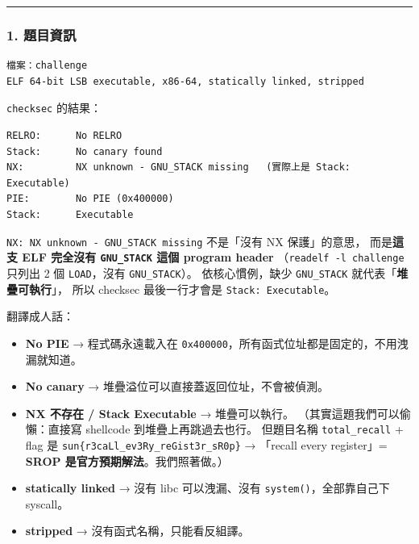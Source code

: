 \documentclass[10pt,a4paper]{article}
\providecommand{\tightlist}{%
  \setlength{\itemsep}{0pt}\setlength{\parskip}{0pt}}
\renewenvironment{quote}{%
  \begin{mdframed}[linewidth=0pt,innerleftmargin=0pt,innerrightmargin=0pt,
    innerbottommargin=0pt,innertopmargin=0pt,skipabove=0.55em,skipbelow=0.55em,
    leftmargin=0.9em,rightmargin=0.4em,startcode={\color{quotebar}\vrule width 2.6pt},%
    endcode={}]%
  \itshape\color{black}%
}{%
  \end{mdframed}%
}
\begin{document}
\begin{center}\rule{0.5\linewidth}{0.5pt}\end{center}

\subsubsection{1. 題目資訊}\label{ux984cux76eeux8cc7ux8a0a}

\begin{Verbatim}[breaklines=true,breakanywhere=true,breakautoindent=false,fontsize=\fontsize{7.0}{9.5}\selectfont]
檔案：challenge
ELF 64-bit LSB executable, x86-64, statically linked, stripped
\end{Verbatim}

\texttt{checksec} 的結果：

\begin{Verbatim}[breaklines=true,breakanywhere=true,breakautoindent=false,fontsize=\fontsize{7.0}{9.5}\selectfont]
RELRO:      No RELRO
Stack:      No canary found
NX:         NX unknown - GNU_STACK missing   (實際上是 Stack: Executable)
PIE:        No PIE (0x400000)
Stack:      Executable
\end{Verbatim}

\begin{quote}
\texttt{NX:\allowbreak{}\ \allowbreak{}NX\ \allowbreak{}unknown\ \allowbreak{}-\allowbreak{}\ \allowbreak{}GNU\_\allowbreak{}STACK\ \allowbreak{}missing} 不是「沒有 NX
保護」的意思， 而是\textbf{這支 ELF 完全沒有 \texttt{GNU\_\allowbreak{}STACK} 這個
program header} （\texttt{readelf\ \allowbreak{}-\allowbreak{}l\ \allowbreak{}challenge} 只列出 2 個
\texttt{LOAD}，沒有 \texttt{GNU\_\allowbreak{}STACK}）。 依核心慣例，缺少
\texttt{GNU\_\allowbreak{}STACK} 就代表「\textbf{堆疊可執行}」， 所以 checksec
最後一行才會是 \texttt{Stack:\allowbreak{}\ \allowbreak{}Executable}。
\end{quote}

翻譯成人話：

\begin{itemize}
\tightlist
\item
  \textbf{No PIE} → 程式碼永遠載入在
  \texttt{0x400000}，所有函式位址都是固定的，不用洩漏就知道。
\item
  \textbf{No canary} → 堆疊溢位可以直接蓋返回位址，不會被偵測。
\item
  \textbf{NX 不存在 / Stack Executable} → 堆疊可以執行。
  （其實這題我們可以偷懶：直接寫 shellcode 到堆疊上再跳過去也行。
  但題目名稱 \texttt{total\_\allowbreak{}recall} + flag 是
  \texttt{sun\{\allowbreak{}r3caLl\_\allowbreak{}ev3Ry\_\allowbreak{}reGist3r\_\allowbreak{}sR0p\}\allowbreak{}} → 「recall every
  register」= \textbf{SROP 是官方預期解法}。我們照著做。）
\item
  \textbf{statically linked} → 沒有 libc 可以洩漏、沒有
  \texttt{system()}，全部靠自己下 syscall。
\item
  \textbf{stripped} → 沒有函式名稱，只能看反組譯。
\end{itemize}
\end{document}
